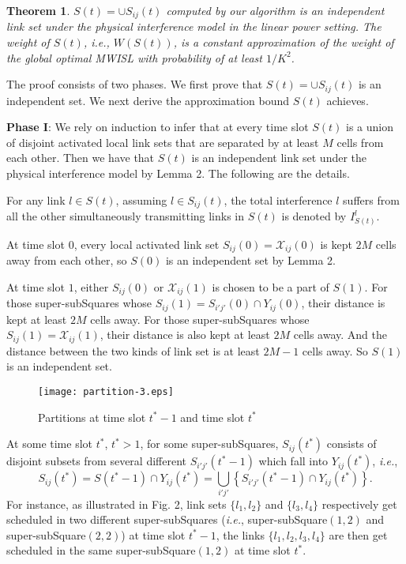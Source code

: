 \documentclass[journal]{IEEEtran}
\begin{document}
\newtheorem{theorem}{Theorem}
\begin{theorem}
$S(t)=\cup S_{ij} (t)$ computed by our algorithm is an independent link set under the physical interference model in the linear power setting. The weight of $S(t)$, \emph{i.e.}, $W(S(t))$, is a constant approximation of the weight of the global optimal MWISL with probability of at least $1/K^2$.
\label{theorem1}
\end{theorem}
\begin{IEEEproof}
The proof consists of two phases. We first prove that $S(t)=\cup S_{ij} (t)$ is an independent set. We next derive the approximation bound  $S(t)$ achieves.

\textbf{Phase I}: We rely on induction to infer that at every time slot $S(t)$ is a union of disjoint activated local link sets that are separated by at least $M$ cells from each other. Then we have that $S(t)$ is an independent link set under the physical interference model by Lemma 2. The following are the details.

For any link $l\in S(t)$, assuming $l\in
S_{ij} (t)$, the total interference $l$ suffers from all the other
simultaneously transmitting links in $S(t)$ is denoted by $I_{S(t)}^l $.

At time slot $0$, every local activated link set $S_{ij} (0)= \mathcal{X}_{ij}(0)$ is kept $2M$
cells away from each other, so $S(0)$ is an independent set by Lemma 2.

At time slot $1$, either $S_{ij} (0)$ or $\mathcal{X}_{ij} (1)$ is chosen to be a part of
$S(1)$. For those super-subSquares whose $S_{ij} (1) = S_{i'j'}(0) \cap Y_{ij} (0)$, their distance is kept at least $2M$ cells away. For those super-subSquares whose $S_{ij} (1)=\mathcal{X}_{ij} (1)$, their distance is also kept at least $2M$ cells away. And the distance between the two kinds of link set is at least $2M-1$ cells away. So $S(1)$ is an independent set.

\begin{figure}
\centering
\texttt{[image: partition-3.eps]}
\caption{Partitions at time slot $t^*-1$ and time slot $t^*$}
\end{figure}


At some time slot $t^\ast $, $t^\ast >1$, for some super-subSquares,
$S_{ij} (t^\ast )$ consists of disjoint subsets from several
different $S_{i'j'} (t^\ast -1)$  which fall into $Y_{ij} (t^\ast )$,
\emph{i.e.},
{\small{\begin{equation}
S_{ij} (t^\ast ) = S(t^\ast -1)\cap Y_{ij} (t^\ast )
=\bigcup\limits_{i'j'} {\left\{ {S_{i'j'} (t^\ast -1)\cap Y_{ij} (t^\ast )}\right\}}.
\end{equation}
}}
  For instance, as illustrated in Fig. 2,  link sets $\{l_1,l_2\}$ and $\{l_3,l_4\}$ respectively get scheduled in two different super-subSquares (\emph{i.e.}, super-subSquare$(1,2)$ and super-subSquare$(2,2)$) at time slot $t^*-1$, the links $\{l_1,l_2,l_3,l_4\}$ are then get scheduled in the same super-subSquare$(1,2)$ at time slot $t^*$.



\end{IEEEproof}
\end{document}
